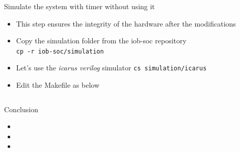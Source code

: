 \documentclass [xcolor=svgnames, t] {beamer}
\begin{document}
\begin{frame}[fragile]{Simulate the system with timer without using it}

\begin{itemize}
\item This step ensures the integrity of the hardware after the modifications
\item Copy the simulation folder from the iob-soc repository\\
  {\tt cp -r iob-soc/simulation} 
\item Let's use the {\it icarus verilog} simulator 
  {\tt cs simulation/icarus} 
\item Edit the Makefile as below
\end{itemize}



\begin{tiny}
\begin{lstlisting}

\end{lstlisting}
\end{tiny}
\end{frame}



\begin{frame}{Conclusion}
\begin{itemize}
\item 
\item 
\item 
\end{itemize}
\end{frame}




\end{document}

